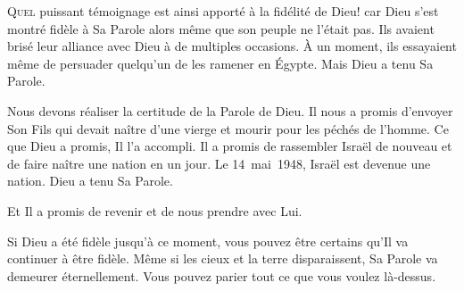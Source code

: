 



\lettrine{Q}{uel} puissant témoignage est ainsi apporté
 à la fidélité de Dieu! \ocadr car Dieu s'est montré fidèle
 à Sa Parole alors même que son peuple ne l'était pas.
 Ils avaient brisé leur alliance avec Dieu à de multiples occasions.
 \`A un moment, ils essayaient même de persuader quelqu'un
 de les ramener en Égypte. Mais Dieu a tenu Sa Parole.


Nous devons réaliser la certitude de la Parole de Dieu.
 Il nous a promis d'envoyer Son Fils qui devait naître
 d'une vierge et mourir pour les péchés de l'homme.
 Ce que Dieu a promis, Il l'a accompli.
 Il a promis de rassembler Israël de nouveau
 et de faire naître une nation en un jour.
 Le 14~mai~1948, Israël est devenue une nation. Dieu a tenu Sa Parole.

Et Il a promis de revenir et de nous prendre avec Lui.

Si Dieu a été fidèle jusqu'à ce moment, vous pouvez être certains
 qu'Il va continuer à être fidèle. Même si les cieux et la terre disparaissent,
 Sa Parole va demeurer éternellement.
 Vous pouvez parier tout ce que vous voulez là-dessus. 

\dvrule



